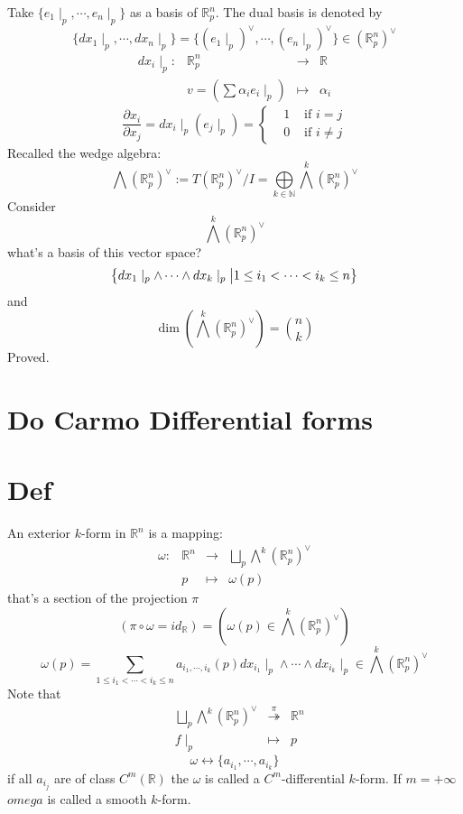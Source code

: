 \documentclass{article}
\begin{document}
Take $\{e_1\mid_p,\cdots,e_n\mid_p\}$ as a basis of $\mathbb{R}^n_p$. The dual basis is denoted by $$\{dx_1\mid_p,\cdots,dx_n\mid_p\}=\{(e_1\mid_p)^\vee,\cdots,(e_n\mid_p)^\vee\}\in (\mathbb{R}_p^n)^\vee$$
$$\begin{aligned}
    dx_i\mid_p: &\mathbb{R}^n_p &\rightarrow &\mathbb{R}\\
    &v=(\sum\alpha_ie_i\mid_p)&\mapsto &\alpha_i
\end{aligned}$$
$$\frac{\partial x_i}{\partial x_j}=dx_i\mid_p(e_j\mid_p)=\left\{\begin{aligned}
    &1&\text{ if }i=j\\
    &0&\text{ if }i\neq j
\end{aligned}\right.$$
Recalled the wedge algebra:
$$\bigwedge(\mathbb{R}^n_p)^\vee:=T(\mathbb{R}^n_p)^\vee/I=\bigoplus\limits_{k\in \mathbb{N}}\bigwedge\limits^k(\mathbb{R}_p^n)^\vee$$
Consider $$\bigwedge\limits^k(\mathbb{R}_p^n)^\vee$$
what's a basis of this vector space?
$$\left\{dx_1\mid_p\wedge\cdots\wedge dx_k\mid_p\textbf{\big|}1\leq i_1<\cdots< i_k\leq n\right\}$$
and $$\dim(\bigwedge\limits^k(\mathbb{R}_p^n)^\vee)={n\choose k}$$
Proved.
\section{Do Carmo Differential forms}
\section{Def}
An exterior $k$-form in $\mathbb{R}^n$ is a mapping:
$$\begin{aligned}
    \omega: &\mathbb{R}^n &\rightarrow &\bigsqcup\limits_{p}\bigwedge\limits^k(\mathbb{R}_p^n)^\vee\\
    &p&\mapsto&\omega(p)
\end{aligned}$$
that's a section of the projection $\pi$
$$(\pi\circ \omega=id_\mathbb{R})=(\omega(p)\in \bigwedge\limits^k(\mathbb{R}^n_p)^\vee)$$
$$\omega(p)=\sum\limits_{1\leq i_1<\cdots<i_k\leq n}a_{i_1,\cdots,i_k}(p)dx_{i_1}\mid_p\wedge\cdots\wedge dx_{i_k}\mid_p\in \bigwedge\limits^k(\mathbb{R}_p^n)^\vee$$
Note that
$$\begin{aligned}
    &\bigsqcup\limits_{p}\bigwedge\limits^k(\mathbb{R}_p^n)^\vee&\stackrel{\pi}{\twoheadrightarrow}&\mathbb{R}^n\\
    &f\mid_p&\mapsto&p 
\end{aligned}$$
$$\omega\leftrightarrow\{a_{i_1},\cdots,a_{i_k}\}$$
if all $a_{i_j}$ are of class $C^m(\mathbb{R})$ the $\omega$ is called a $C^m$-differential $k$-form. If $m=+\infty$ $omega$ is called a smooth $k$-form.
\end{document}
